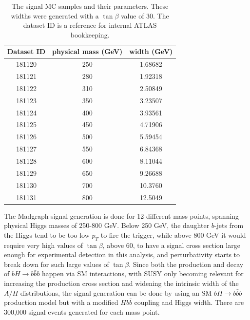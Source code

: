 


\begin{table}
   \caption{The signal MC samples and their parameters. These widths were generated with 
   a $\tan\beta$ value of 30.  The dataset ID is a reference for internal ATLAS bookkeeping.\label{tab:sig_mc_parameters} }
    \center
    \begin{tabular}{ c c c } \hline\hline
    Dataset ID & physical mass (GeV) & width (GeV) \\ \hline
    181120     & 250        & 1.68682 \\
    181121     & 280        & 1.92318 \\
    181122     & 310        & 2.50849 \\
    181123     & 350        & 3.23507 \\
    181124     & 400        & 3.93561 \\
    181125     & 450        & 4.71906 \\
    181126     & 500        & 5.59454 \\
    181127     & 550        & 6.84368 \\
    181128     & 600        & 8.11044 \\
    181129     & 650        & 9.26688 \\
    181130     & 700        & 10.3760 \\
    181131     & 800        & 12.5049 \\ \hline
    \end{tabular}
\end{table}





The Madgraph signal generation is done for 12 different mass points, spanning physical
Higgs masses of 250-800 GeV. 
Below 250 GeV, the daughter $b$-jets from the Higgs tend to be 
too low-$p_T$ to fire the trigger, while above 800 GeV it would require very 
high values of $\tan\beta$, above 60, to have a signal cross section large enough
for experimental detection in this analysis, and perturbativity starts to break
down for such large values of $\tan\beta$.
Since both the production and decay of $bH\rightarrow b\bar{b}b$ 
happen via SM interactions, with SUSY only becoming relevant for increasing the production cross section and 
widening the intrinsic width of the $A/H$ distributions, the signal generation can 
be done by using an SM $bH\rightarrow b\bar{b}b$ production model but with a 
modified $Hb\bar{b}$ coupling and Higgs width.  There are 300,000 signal events generated for each mass point.

